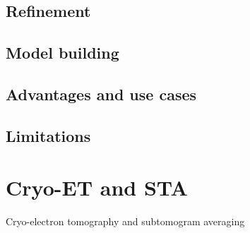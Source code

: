 \subsection{Refinement}\label{refinement}

\subsection{Model building}


\subsection{Advantages and use cases}

\subsection{Limitations}


\section{Cryo-ET and STA}{Cryo-electron tomography and subtomogram averaging}

\FloatBarrier

